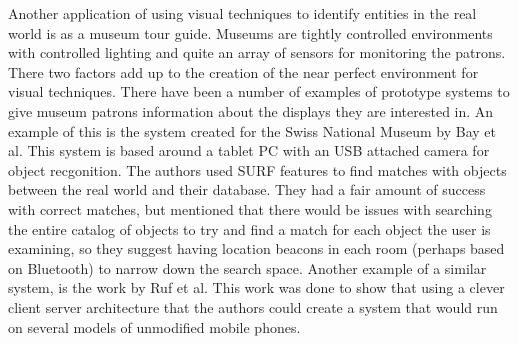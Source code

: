 \documentclass{acm_proc_article-sp}
\begin{document}
Another application of using visual techniques to identify entities in the real world is as a museum tour guide.  Museums are tightly controlled environments with controlled lighting and quite an array of sensors for monitoring the patrons. There two factors add up to the creation of the near perfect environment for visual techniques.   There have been a number of examples of prototype systems to give museum patrons information about the displays they are interested in.  An example of this is the system created for the Swiss National Museum by Bay et al.  This system is based around a tablet PC with an USB attached camera for object recgonition.  The authors used SURF features to find matches with objects between the real world and their database.  They had a fair amount of success with correct matches, but mentioned that there would be issues with searching the entire catalog of objects to try and find a match for each object the user is examining, so they suggest having location beacons in each room (perhaps based on Bluetooth) to narrow down the search space. \cite{bay2006interactive}  Another example of a similar system, is the work by Ruf et al. \cite{ruf2010mobile}  This work was done to show that using a clever client server architecture that the authors could create a system that would run on several models of unmodified mobile phones.
\end{document}
